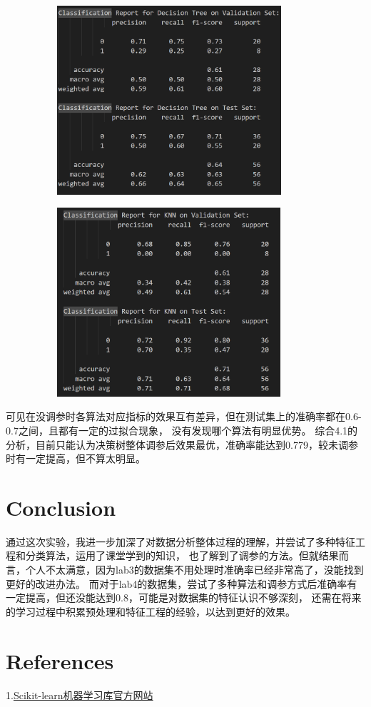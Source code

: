 \documentclass{ctexart}
\begin{document}
			\begin{figure}[H]
				\centering 
				\includegraphics[height=7cm,width=10cm]{8.png}
				\end{figure}
				\begin{figure}[H]
					\centering 
					\includegraphics[height=7cm,width=10cm]{9.png}
					\end{figure}
			可见在没调参时各算法对应指标的效果互有差异，但在测试集上的准确率都在0.6-0.7之间，且都有一定的过拟合现象，
			没有发现哪个算法有明显优势。
			综合4.1的分析，目前只能认为决策树整体调参后效果最优，准确率能达到0.779，较未调参时有一定提高，但不算太明显。
   \section{Conclusion}	
   通过这次实验，我进一步加深了对数据分析整体过程的理解，并尝试了多种特征工程和分类算法，运用了课堂学到的知识，
   也了解到了调参的方法。但就结果而言，个人不太满意，因为lab3的数据集不用处理时准确率已经非常高了，没能找到更好的改进办法。
   而对于lab4的数据集，尝试了多种算法和调参方式后准确率有一定提高，但还没能达到0.8，可能是对数据集的特征认识不够深刻，
   还需在将来的学习过程中积累预处理和特征工程的经验，以达到更好的效果。
   \section{References}
   1.\href{https://scikit-learn.org/stable/}{Scikit-learn机器学习库官方网站}
\end{document}
